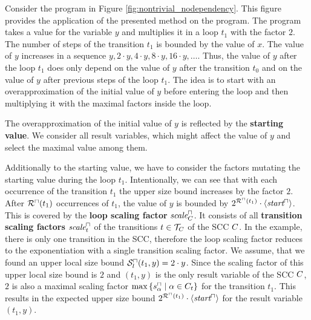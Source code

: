 \begin{example}
  
  Consider the program in Figure \ref{fig:nontrivial_nodependency}.
  This figure provides the application of the presented method on the program.
  The program takes a value for the variable $y$ and multiplies it in a loop $t_1$ with the factor $2$.
  The number of steps of the transition $t_1$ is bounded by the value of $x$.
  The value of $y$ increases in a sequence $y, 2 \cdot y, 4 \cdot y, 8 \cdot y, 16 \cdot y, \dots$.
  Thus, the value of $y$ after the loop $t_1$ does only depend on the value of $y$ after the transition $t_0$ and on the value of $y$ after previous steps of the loop $t_1$.
  The idea is to start with an overapproximation of the initial value of $y$ before entering the loop and then multiplying it with the maximal factors inside the loop.
  
  The overapproximation of the initial value of $y$ is reflected by the \textbf{starting value}.
  We consider all result variables, which might affect the value of $y$ and select the maximal value among them.
  
  Additionally to the starting value, we have to consider the factors mutating the starting value during the loop $t_1$.
  Intentionally, we can see that with each occurrence of the transition $t_1$ the upper size bound increases by the factor $2$.
  After ${\mathcal{R}^\sqcap}(t_1)$ occurrences of $t_1$, the value of $y$ is bounded by $2^{{\mathcal{R}^\sqcap}(t_1)} \cdot \left\langle \emph{start}^\sqcap \right\rangle$.
  This is covered by the \textbf{loop scaling factor} $\emph{scale}^\sqcap_C$.
  It consists of all \textbf{transition scaling factors} $\emph{scale}^\sqcap_t$ of the transitions $t \in \mathcal{T}_C$ of the SCC $C$.
  In the example, there is only one transition in the SCC, therefore the loop scaling factor reduces to the exponentiation with a single transition scaling factor.
  We assume, that we found an upper local size bound ${\mathcal{S}^\sqcap_l}(t_1,y) = 2 \cdot y$.
  Since the scaling factor of this upper local size bound is $2$ and $(t_1,y)$ is the only result variable of the SCC $C$, $2$ is also a maximal scaling factor $\max \left\lbrace s^\sqcap_\alpha \mid \alpha \in C_t \right\rbrace$ for the transition $t_1$.
  This results in the expected upper size bound $2^{{\mathcal{R}^\sqcap}(t_1)} \cdot \left\langle \emph{start}^\sqcap \right\rangle$ for the result variable $(t_1,y)$.
\end{example}

